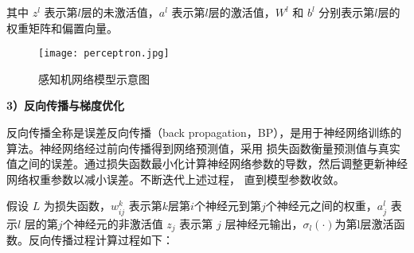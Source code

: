 其中 $z^{l}$ 表示第$l$层的未激活值，$a^{l}$ 表示第$l$层的激活值，$W^{l}$ 和 $b^{l}$ 分别表示第$l$层的权重矩阵和偏置向量。
\begin{figure}
  \centering
  \texttt{[image: perceptron.jpg]}
  \caption{感知机网络模型示意图}
  \label{fig:perceptron}
\end{figure}

\textbf{3）反向传播与梯度优化}

反向传播全称是误差反向传播（back propagation，BP），是用于神经网络训练的算法。神经网络经过前向传播得到网络预测值，采用
损失函数衡量预测值与真实值之间的误差。通过损失函数最小化计算神经网络参数的导数，然后调整更新神经网络权重参数以减小误差。不断迭代上述过程，
直到模型参数收敛。

假设 $L$ 为损失函数，$w_{ij}^k$ 表示第$k$层第$i$个神经元到第$j$个神经元之间的权重，$a_j^l$ 表示$l$ 层的第$j$个神经元的非激活值
$z_j$ 表示第 $j$ 层神经元输出，$\sigma_l(\cdot)$为第l层激活函数。反向传播过程计算过程如下：
